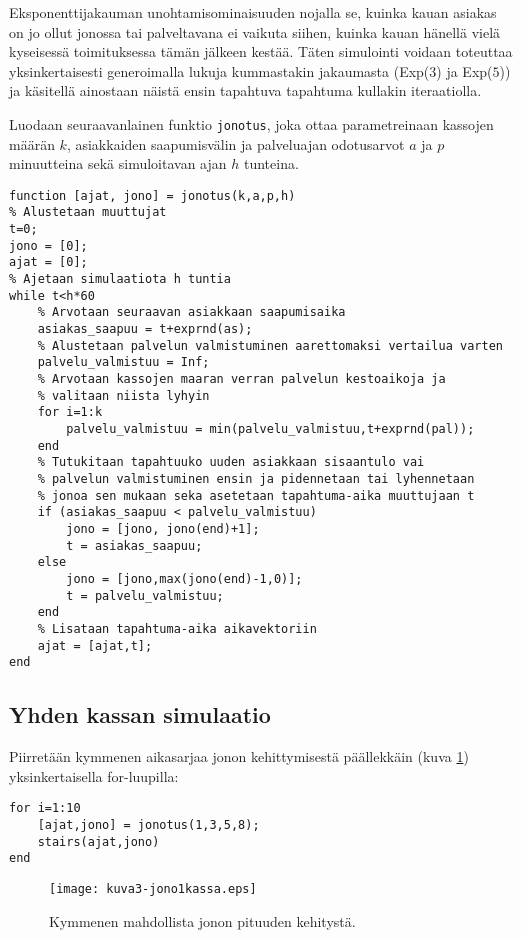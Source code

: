 \documentclass[a4paper,11pt]{article}
\begin{document}
{Eksponenttijakauman unohtamisominaisuuden nojalla se, kuinka kauan asiakas on jo ollut jonossa tai palveltavana ei vaikuta siihen, kuinka kauan hänellä vielä kyseisessä toimituksessa tämän jälkeen kestää. Täten simulointi voidaan toteuttaa yksinkertaisesti generoimalla lukuja kummastakin jakaumasta (Exp($3$) ja Exp($5$)) ja käsitellä ainostaan näistä ensin tapahtuva tapahtuma kullakin iteraatiolla.

Luodaan seuraavanlainen funktio \texttt{jonotus}, joka ottaa parametreinaan kassojen määrän $k$, asiakkaiden saapumisvälin ja palveluajan odotusarvot $a$ ja $p$ minuutteina sekä simuloitavan ajan $h$ tunteina.

\begin{lstlisting}
function [ajat, jono] = jonotus(k,a,p,h)
% Alustetaan muuttujat
t=0;
jono = [0];
ajat = [0];
% Ajetaan simulaatiota h tuntia
while t<h*60
    % Arvotaan seuraavan asiakkaan saapumisaika
    asiakas_saapuu = t+exprnd(as);
    % Alustetaan palvelun valmistuminen aarettomaksi vertailua varten
    palvelu_valmistuu = Inf;
    % Arvotaan kassojen maaran verran palvelun kestoaikoja ja
    % valitaan niista lyhyin
    for i=1:k
        palvelu_valmistuu = min(palvelu_valmistuu,t+exprnd(pal));
    end
    % Tutukitaan tapahtuuko uuden asiakkaan sisaantulo vai
    % palvelun valmistuminen ensin ja pidennetaan tai lyhennetaan
    % jonoa sen mukaan seka asetetaan tapahtuma-aika muuttujaan t
    if (asiakas_saapuu < palvelu_valmistuu)
        jono = [jono, jono(end)+1];
        t = asiakas_saapuu;
    else
        jono = [jono,max(jono(end)-1,0)];
        t = palvelu_valmistuu;
    end
    % Lisataan tapahtuma-aika aikavektoriin
    ajat = [ajat,t];
end
\end{lstlisting}

\subsection{Yhden kassan simulaatio}

Piirretään kymmenen aikasarjaa jonon kehittymisestä päällekkäin (kuva \ref{fig:ykskassa}) yksinkertaisella for-luupilla:

\begin{lstlisting}
for i=1:10
    [ajat,jono] = jonotus(1,3,5,8);
    stairs(ajat,jono)
end
\end{lstlisting}

\begin{figure}
    \centering
    \texttt{[image: kuva3-jono1kassa.eps]}
    \caption{Kymmenen mahdollista jonon pituuden kehitystä.}
    \label{fig:ykskassa}
\end{figure}

}
\end{document}
